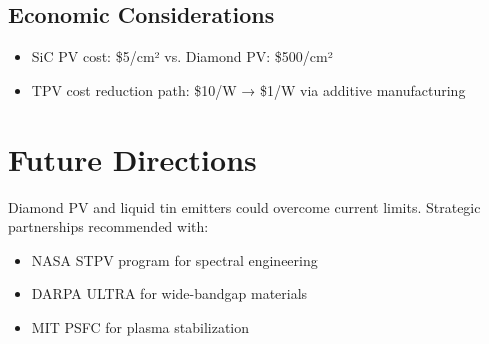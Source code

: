 \documentclass{article}
\begin{document}
\subsection{Economic Considerations}
\begin{itemize}
    \item SiC PV cost: \$5/cm² vs. Diamond PV: \$500/cm²
    \item TPV cost reduction path: \$10/W → \$1/W via additive manufacturing
\end{itemize}

\section{Future Directions}
\label{sec:future}
Diamond PV and liquid tin emitters \citep{stanford2022} could overcome current limits. Strategic partnerships recommended with:
\begin{itemize}
    \item NASA STPV program \citep{nasa2023} for spectral engineering
    \item DARPA ULTRA for wide-bandgap materials
    \item MIT PSFC for plasma stabilization
\end{itemize}



\end{document}
